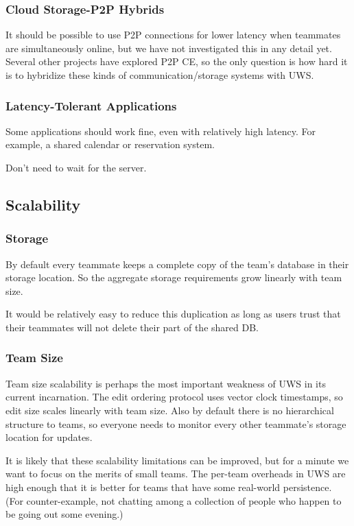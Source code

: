 \documentclass{article}
\begin{document}
\subsubsection{Cloud Storage-P2P Hybrids}

It should be possible to use P2P connections for lower latency when teammates are simultaneously online, but we have not investigated this in any detail yet.
Several other projects have explored P2P CE, so the only question is how hard it is to hybridize these kinds of communication/storage systems with UWS.

\subsubsection{Latency-Tolerant Applications}

Some applications should work fine, even with relatively high latency.
For example, a shared calendar or reservation system.

Don't need to wait for the server.

\subsection{Scalability}

\subsubsection{Storage}

By default every teammate keeps a complete copy of the team's database in their storage location.
So the aggregate storage requirements grow linearly with team size.

It would be relatively easy to reduce this duplication as long as users trust that their teammates will not delete their part of the shared DB.

\subsubsection{Team Size}

Team size scalability is perhaps the most important weakness of UWS in its current incarnation.
The edit ordering protocol uses vector clock timestamps, so edit size scales linearly with team size.
Also by default there is no hierarchical structure to teams, so everyone needs to monitor every other teammate's storage location for updates.

It is likely that these scalability limitations can be improved, but for a minute we want to focus on the merits of small teams.
The per-team overheads in UWS are high enough that it is better for teams that have some real-world persistence.
(For counter-example, not chatting among a collection of people who happen to be going out some evening.)
\end{document}
